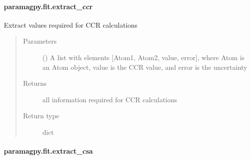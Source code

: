 \documentclass[a4paper,10pt,english]{sphinxmanual}
\begin{document}
\paragraph{paramagpy.fit.extract\_ccr}
\label{\detokenize{reference/generated/paramagpy.fit.extract_ccr:paramagpy-fit-extract-ccr}}\label{\detokenize{reference/generated/paramagpy.fit.extract_ccr::doc}}

\begin{fulllineitems}
\label{\detokenize{reference/generated/paramagpy.fit.extract_ccr:paramagpy.fit.extract_ccr}}
Extract values required for CCR calculations
\begin{quote}\begin{description}
\item[{Parameters}] \leavevmode
{} () \textendash{} A list with elements {[}Atom1, Atom2, value, error{]}, where Atom is
an Atom object, value is the CCR value, and error is the uncertainty

\item[{Returns}] \leavevmode
{} \textendash{} all information required for CCR calculations

\item[{Return type}] \leavevmode
dict

\end{description}\end{quote}

\end{fulllineitems}



\paragraph{paramagpy.fit.extract\_csa}
\label{\detokenize{reference/generated/paramagpy.fit.extract_csa:paramagpy-fit-extract-csa}}\label{\detokenize{reference/generated/paramagpy.fit.extract_csa::doc}}
\end{document}
